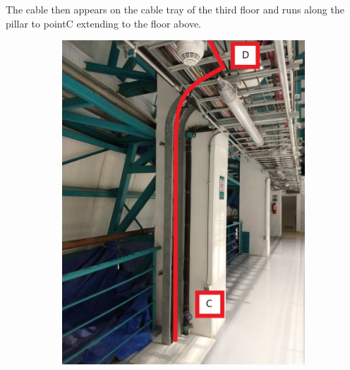   The cable then appears on the cable tray of the third floor and runs along the pillar to pointC extending to the floor above.

  \begin{figure}
    \centering
    \begin{subfigure}{0.3\textwidth}
      \centering
      \includegraphics[width=\textwidth]{images/14.jpg}
    \end{subfigure}
   \hfill
    \begin{subfigure}{0.3\textwidth}
      \centering

\end{subfigure}
\end{figure}
